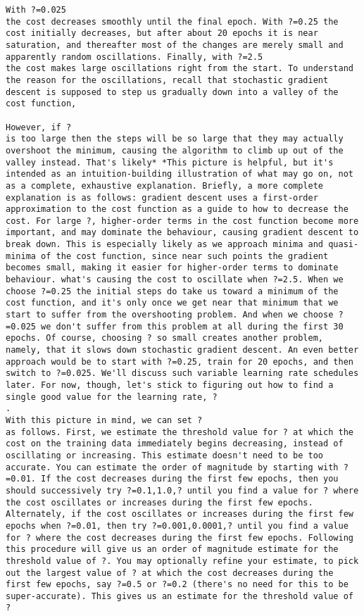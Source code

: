 \begin{lstlisting}
With ?=0.025
the cost decreases smoothly until the final epoch. With ?=0.25 the cost initially decreases, but after about 20 epochs it is near saturation, and thereafter most of the changes are merely small and apparently random oscillations. Finally, with ?=2.5
the cost makes large oscillations right from the start. To understand the reason for the oscillations, recall that stochastic gradient descent is supposed to step us gradually down into a valley of the cost function,

However, if ?
is too large then the steps will be so large that they may actually overshoot the minimum, causing the algorithm to climb up out of the valley instead. That's likely* *This picture is helpful, but it's intended as an intuition-building illustration of what may go on, not as a complete, exhaustive explanation. Briefly, a more complete explanation is as follows: gradient descent uses a first-order approximation to the cost function as a guide to how to decrease the cost. For large ?, higher-order terms in the cost function become more important, and may dominate the behaviour, causing gradient descent to break down. This is especially likely as we approach minima and quasi-minima of the cost function, since near such points the gradient becomes small, making it easier for higher-order terms to dominate behaviour. what's causing the cost to oscillate when ?=2.5. When we choose ?=0.25 the initial steps do take us toward a minimum of the cost function, and it's only once we get near that minimum that we start to suffer from the overshooting problem. And when we choose ?=0.025 we don't suffer from this problem at all during the first 30 epochs. Of course, choosing ? so small creates another problem, namely, that it slows down stochastic gradient descent. An even better approach would be to start with ?=0.25, train for 20 epochs, and then switch to ?=0.025. We'll discuss such variable learning rate schedules later. For now, though, let's stick to figuring out how to find a single good value for the learning rate, ?
.
With this picture in mind, we can set ?
as follows. First, we estimate the threshold value for ? at which the cost on the training data immediately begins decreasing, instead of oscillating or increasing. This estimate doesn't need to be too accurate. You can estimate the order of magnitude by starting with ?=0.01. If the cost decreases during the first few epochs, then you should successively try ?=0.1,1.0,? until you find a value for ? where the cost oscillates or increases during the first few epochs. Alternately, if the cost oscillates or increases during the first few epochs when ?=0.01, then try ?=0.001,0.0001,? until you find a value for ? where the cost decreases during the first few epochs. Following this procedure will give us an order of magnitude estimate for the threshold value of ?. You may optionally refine your estimate, to pick out the largest value of ? at which the cost decreases during the first few epochs, say ?=0.5 or ?=0.2 (there's no need for this to be super-accurate). This gives us an estimate for the threshold value of ?

\end{lstlisting}
